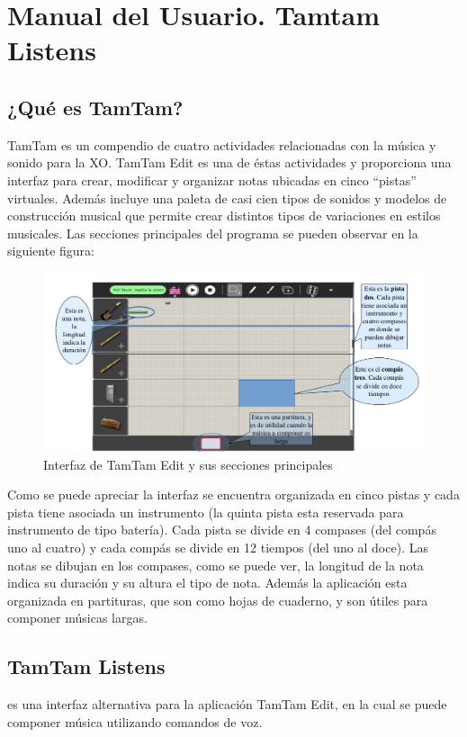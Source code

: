 \section{Manual del Usuario. Tamtam Listens}

\subsection{¿Qu\'e es TamTam?}

TamTam es un compendio de cuatro actividades relacionadas con la m\'usica y sonido para la XO.
TamTam Edit es una de \'estas actividades y proporciona una interfaz para crear, modificar y organizar
notas ubicadas en cinco ``pistas'' virtuales. Adem\'as incluye una paleta de casi cien tipos de sonidos y
modelos de construcci\'on musical que permite crear distintos tipos de variaciones en estilos musicales.
Las secciones principales del programa se pueden observar en la siguiente figura:


\begin{figure}[H] 
\centering
\includegraphics[width=1\textwidth]{./graphics/ui-tamtam.png}
\caption{Interfaz de TamTam Edit y sus secciones principales}
\label{figure:ui-tamtam-anexo}
\end{figure}

Como se puede apreciar la interfaz se encuentra organizada en cinco pistas y cada pista tiene asociada
un instrumento (la quinta pista esta reservada para instrumento de tipo bater\'ia). Cada pista se divide en
4 compases (del comp\'as uno al cuatro) y cada comp\'as se divide en 12 tiempos (del uno al doce). Las
notas se dibujan en los compases, como se puede ver, la longitud de la nota indica su duraci\'on y su
altura el tipo de nota.  Adem\'as la aplicaci\'on esta organizada en partituras, que son como hojas  de
cuaderno, y son \'utiles para componer m\'usicas largas.

\subsection{TamTam Listens}
 es una interfaz alternativa para la aplicaci\'on TamTam Edit, en la cual se puede
componer m\'usica utilizando comandos de voz. 

